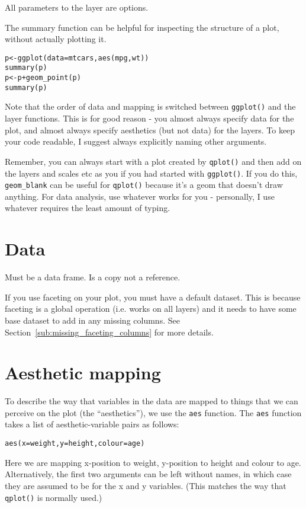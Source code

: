 All parameters to the layer are options.

The summary function can be helpful for inspecting the structure of a plot, without actually plotting it.

\begin{alltt}
p <- ggplot(data=mtcars, aes(mpg, wt))
summary(p)
p <- p + geom_point(p)
summary(p)
\end{alltt}

Note that the order of data and mapping is switched between {\tt ggplot()} and the layer functions.  This is for good reason - you almost always specify data for the plot, and almost always specify aesthetics (but not data) for the layers.  To keep your code readable, I suggest always explicitly naming other arguments.

Remember, you can always start with a plot created by {\tt qplot()} and then add on the layers and scales etc as you if you had started with {\tt ggplot()}.  If you do this, {\tt geom\_blank} can be useful for {\tt qplot()} because it's a geom that doesn't draw anything.  For data analysis, use whatever works for you - personally, I use whatever requires the least amount of typing.

\section{Data}
\label{sec:data}

Must be a data frame.
Is a copy not a reference.

If you use faceting on your plot, you must have a default dataset.  This is because faceting is a global operation (i.e. works on all layers) and it needs to have some base dataset to add in any missing columns.  See Section~\ref{sub:missing_faceting_columns} for more details.

\section{Aesthetic mapping}
\label{sec:aes}

To describe the way that variables in the data are mapped to things that we can perceive on the plot (the ``aesthetics''), we use the {\tt aes} function.  The {\tt aes} function takes a list of aesthetic-variable pairs as follows:

\begin{alltt}
aes(x = weight, y = height, colour = age)
\end{alltt}

Here we are mapping x-position to weight, y-position to height and colour to age.  Alternatively, the first two arguments can be left without names, in which case they are assumed to be for the x and y variables.  (This matches the way that {\tt qplot()} is normally used.)

